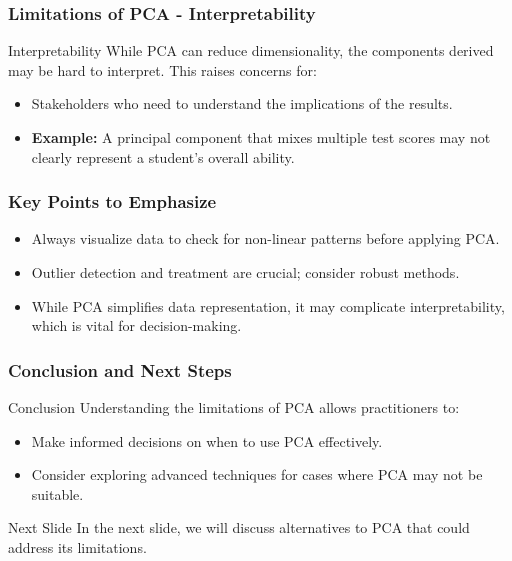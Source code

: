 \documentclass[aspectratio=169]{beamer}
\begin{document}
\begin{frame}[fragile]
    \frametitle{Limitations of PCA - Interpretability}
    \begin{block}{Interpretability}
        While PCA can reduce dimensionality, the components derived may be hard to interpret. This raises concerns for:
    \end{block}
    \begin{itemize}
        \item Stakeholders who need to understand the implications of the results.
        \item \textbf{Example:} A principal component that mixes multiple test scores may not clearly represent a student's overall ability.
    \end{itemize}
\end{frame}

\begin{frame}[fragile]
    \frametitle{Key Points to Emphasize}
    \begin{itemize}
        \item Always visualize data to check for non-linear patterns before applying PCA.
        \item Outlier detection and treatment are crucial; consider robust methods.
        \item While PCA simplifies data representation, it may complicate interpretability, which is vital for decision-making.
    \end{itemize}
\end{frame}

\begin{frame}[fragile]
    \frametitle{Conclusion and Next Steps}
    \begin{block}{Conclusion}
        Understanding the limitations of PCA allows practitioners to:
    \end{block}
    \begin{itemize}
        \item Make informed decisions on when to use PCA effectively.
        \item Consider exploring advanced techniques for cases where PCA may not be suitable.
    \end{itemize}
    \begin{block}{Next Slide}
        In the next slide, we will discuss alternatives to PCA that could address its limitations.
    \end{block}
\end{frame}
\end{document}
